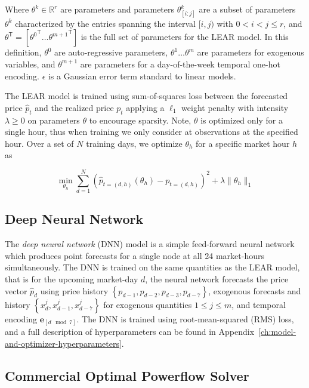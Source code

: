 Where $\theta^k \in \mathbb{R}^r$ are parameters and parameters ${\theta^k_{\left[i:j\right]}}$ are a subset of parameters $\theta^k$
characterized by the entries spanning the interval $[i, j)$ with $0 < i < j \leq r$, and
$\theta^\mathsf{T} = [{\theta^0}^\mathsf{T} \dots {\theta^{m+1}}^\mathsf{T}]$ is the full set of parameters for the LEAR model.
In this definition, $\theta^0$ are auto-regressive parameters, $\theta^{1} \dots \theta^{m}$ are parameters
for exogenous variables, and $\theta^{m+1}$ are parameters for a day-of-the-week temporal one-hot encoding. $\epsilon$
is a Gaussian error term standard to linear models.

The LEAR model is trained using sum-of-squares loss between the forecasted price $\hat{p}_t$ and the realized price
$p_t$ applying a $\ell_1$ weight penalty with intensity $\lambda \geq 0$ on parameters $\theta$ to encourage sparsity.
Note, $\theta$ is optimized only for a single hour, thus when training we only consider at observations at the specified
hour.
Over a set of $N$ training days, we optimize $\theta_h$ for a specific market hour $h$ as

\begin{equation}
    \min_{\theta_h} \sum_{d=1}^N \left(\hat{p}_{t=(d, h)}(\theta_h) - p_{t=(d, h)}\right)^2 + \lambda \lVert \theta_h \rVert_1
    \label{eq:lear_loss}
\end{equation}

\subsection{Deep Neural Network}\label{subsec:deep-neural-network}

The \textit{deep neural network} (DNN) model is a simple feed-forward neural network which produces point forecasts for
a single node at all 24 market-hours simultaneously.
The DNN is trained on the same quantities as the LEAR model, that is for the upcoming market-day $d$, the neural network
forecasts the price vector $\hat{p}_d$ using price history $\left\{ p_{d-1}, p_{d-2}, p_{d-3}, p_{d-7} \right\}$,
exogenous forecasts and history $\left\{ x^j_{d}, x^j_{d - 1}, x^j_{d-7} \right\}$ for exogenous quantities
$1 \leq j \leq m$, and temporal encoding $\mathbf{e}_{\left[d \mod 7\right]}$.
The DNN is trained using root-mean-squared (RMS) loss, and a full description of hyperparameters can be found in
Appendix~\ref{ch:model-and-optimizer-hyperparameters}.

\subsection{Commercial Optimal Powerflow Solver}\label{subsec:commercial-optimal-powerflow-solver}

